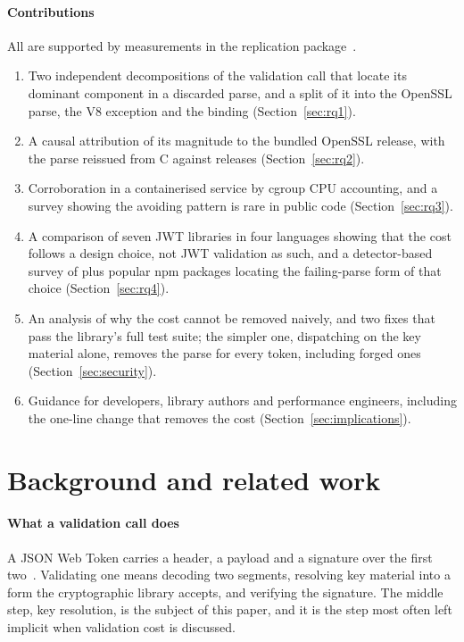 \documentclass[preprint,12pt,authoryear]{elsarticle}
\begin{document}
\paragraph{Contributions} All are supported by measurements in the
replication package~\citep{artifact2026}.
\begin{enumerate}\setlength{\itemsep}{1pt}
\item Two independent decompositions of the validation call that locate its
      dominant component in a discarded parse, and a split of it into the
      OpenSSL parse, the V8 exception and the binding (Section~\ref{sec:rq1}).
\item A causal attribution of its magnitude to the bundled OpenSSL release,
      with the parse reissued from C against \CProbeVersionCount{} releases
      (Section~\ref{sec:rq2}).
\item Corroboration in a containerised service by cgroup CPU accounting, and a
      survey showing the avoiding pattern is rare in public code
      (Section~\ref{sec:rq3}).
\item A comparison of seven JWT libraries in four languages showing that the
      cost follows a design choice, not JWT validation as such, and a
      detector-based survey of \LibJwtInFrame{} plus \LibCryptoInFrame{}
      popular npm packages locating the failing-parse form of that choice
      (Section~\ref{sec:rq4}).
\item An analysis of why the cost cannot be removed naively, and two fixes
      that pass the library's full test suite; the simpler one, dispatching on
      the key material alone, removes the parse for every token, including
      forged ones (Section~\ref{sec:security}).
\item Guidance for developers, library authors and performance engineers,
      including the one-line change that removes the cost
      (Section~\ref{sec:implications}).
\end{enumerate}

\section{Background and related work}\label{sec:related}

\paragraph{What a validation call does} A JSON Web Token carries a header, a
payload and a signature over the first two~\citep{rfc7519}. Validating one means
decoding two segments, resolving key material into a form the cryptographic
library accepts, and verifying the signature. The middle step, key
resolution, is the subject of this paper, and it is the step most often left
implicit when validation cost is discussed.
\end{document}
